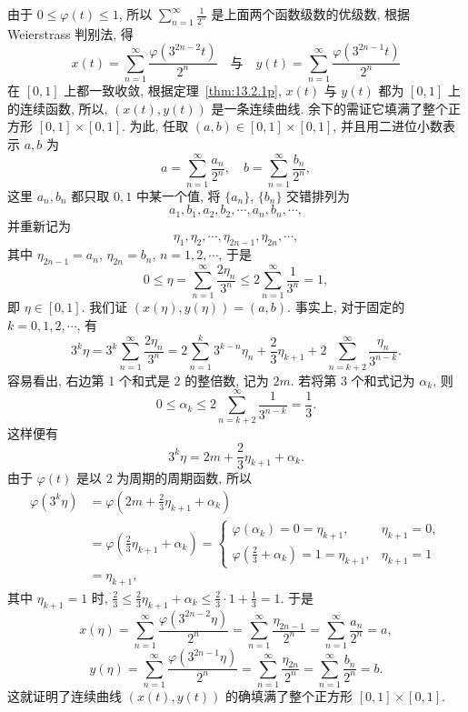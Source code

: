 由于 $0\leqslant\varphi(t)\leqslant1$, 所以 $\sum_{n=1}^{\infty}\frac{1}{2^{n}}$ 是上面两个函数级数的优级数, 根据 Weierstrass 判别法, 得
\[
  x(t)=\sum_{n=1}^{\infty}\frac{\varphi(3^{2n-2}t)}{2^{n}}\quad\text{与}\quad y(t)=\sum_{n=1}^{\infty}\frac{\varphi(3^{2n-1}t)}{2^{n}}
\]
在 $[0,1]$ 上都一致收敛, 根据定理~\ref{thm:13.2.1p}, $x(t)$ 与 $y(t)$ 都为 $[0,1]$ 上的连续函数, 所以, $(x(t),y(t))$ 是一条连续曲线. 余下的需证它填满了整个正方形 $[0,1]\times[0,1]$. 为此, 任取 $(a,b)\in[0,1]\times[0,1]$, 并且用二进位小数表示 $a,b$ 为
\[
  a=\sum_{n=1}^{\infty}\frac{a_{n}}{2^{n}},\quad b=\sum_{n=1}^{\infty}\frac{b_{n}}{2^{n}},
\]
这里 $a_{n},b_{n}$ 都只取 $0,1$ 中某一个值, 将 $\{a_{n}\}$, $\{b_{n}\}$ 交错排列为
\[
  a_{1},b_{1},a_{2},b_{2},\cdots,a_{n},b_{n},\cdots,
\]
并重新记为
\[
  \eta_{1},\eta_{2},\cdots,\eta_{2n-1},\eta_{2n},\cdots,
\]
其中 $\eta_{2n-1}=a_{n}$, $\eta_{2n}=b_{n}$, $n=1,2,\cdots$, 于是
\[
  0\leqslant\eta=\sum_{n=1}^{\infty}\frac{2\eta_{n}}{3^{n}}\leqslant2\sum_{n=1}^{\infty}\frac{1}{3^{n}}=1,
\]
即 $\eta\in[0,1]$. 我们证 $(x(\eta),y(\eta))=(a,b)$. 事实上, 对于固定的 $k=0,1,2,\cdots$, 有
\[
  3^{k}\eta=3^{k}\sum_{n=1}^{\infty}\frac{2\eta_{n}}{3^{n}}=2\sum_{n=1}^{k}3^{k-n}\eta_{n}+\frac{2}{3}\eta_{k+1}+2\sum_{n=k+2}^{\infty}\frac{\eta_{n}}{3^{n-k}}.
\]
容易看出, 右边第 1 个和式是 $2$ 的整倍数, 记为 $2m$. 若将第 3 个和式记为 $\alpha_{k}$, 则
\[
  0\leqslant\alpha_{k}\leqslant2\sum_{n=k+2}^{\infty}\frac{1}{3^{n-k}}=\frac{1}{3}.
\]
这样便有
\[
  3^{k}\eta=2m+\frac{2}{3}\eta_{k+1}+\alpha_{k}.
\]
由于 $\varphi(t)$ 是以 $2$ 为周期的周期函数, 所以
\[
  \begin{aligned}
    \varphi(3^{k}\eta)&=\varphi\left(2m+\frac{2}{3}\eta_{k+1}+\alpha_{k}\right)\\
    &=\varphi\left(\frac{2}{3}\eta_{k+1}+\alpha_{k}\right)=\begin{cases}
      \varphi(\alpha_{k})=0=\eta_{k+1}, & \eta_{k+1}=0,\\
      \varphi\left(\frac{2}{3}+\alpha_{k}\right)=1=\eta_{k+1}, & \eta_{k+1}=1
\end{cases}\\
    &=\eta_{k+1},
  \end{aligned}
\]
其中 $\eta_{k+1}=1$ 时, $\frac{2}{3}\leqslant\frac{2}{3}\eta_{k+1}+\alpha_{k}\leqslant\frac{2}{3}\cdot1+\frac{1}{3}=1$. 于是
\[
  x(\eta)=\sum_{n=1}^{\infty}\frac{\varphi(3^{2n-2}\eta)}{2^{n}}=\sum_{n=1}^{\infty}\frac{\eta_{2n-1}}{2^{n}}=\sum_{n=1}^{\infty}\frac{a_{n}}{2^{n}}=a,
\]
\[
  y(\eta)=\sum_{n=1}^{\infty}\frac{\varphi(3^{2n-1}\eta)}{2^{n}}=\sum_{n=1}^{\infty}\frac{\eta_{2n}}{2^{n}}=\sum_{n=1}^{\infty}\frac{b_{n}}{2^{n}}=b.
\]
这就证明了连续曲线 $(x(t),y(t))$ 的确填满了整个正方形 $[0,1]\times[0,1]$.

